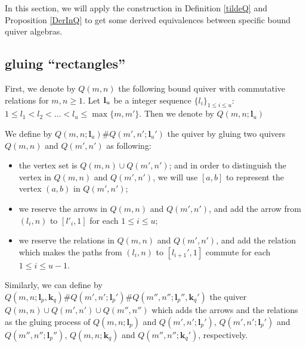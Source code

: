 \documentclass[a4paper, reqno]{amsart}
\theoremstyle{definition}
\theoremstyle{remark}
\numberwithin{equation}{section}
\begin{document}
In this section, we will apply the construction in Definition \ref{tildeQ} and Proposition \ref{DerInQ} to get some derived equivalences between specific bound quiver algebras.

\subsection{gluing ``rectangles''}
First, we denote by $Q(m,n)$ the following bound quiver with commutative relations for $m,n\geq1$. Let {\color{red}${\bf{l}}_u$ be a integer sequence} $\{l_i\}_{1\leq i \leq u}$: $ 1\leq l_1 < l_2 < \dots < l_{u} \leq \max\{m,m'\}$. Then we denote by $Q(m,n;{\mathbf{l}}_u)$
\begin{figure}[H]
    \centering
    \small{  }\label{Q(m,n)}
\end{figure}

We define by $Q(m,n;{\mathbf{l}}_u)\#Q(m',n';{\mathbf{l}}_u')$ the quiver by gluing two quivers $Q(m,n)$ and $Q(m',n')$ as following:
\begin{itemize}
\item the vertex set is $Q(m,n)\cup Q(m',n')$; and in order to distinguish the vertex in $Q(m,n)$ and $Q(m',n')$, we will use $[a,b]$ to represent the vertex $(a,b)$ in $Q(m',n')$;
\item we reserve the arrows in $Q(m,n)$ and $Q(m',n')$, and add the arrow from $(l_i,n)$ to $[l'_i,1]$ for each $1\leq i\leq u$;
\item we reserve the relations in $Q(m,n)$ and $Q(m',n')$, and add the relation which makes the paths from $(l_i,n)$ to $[l_{i+1}',1]$ commute for each $1\leq i\leq u-1$.
\end{itemize}
Similarly, we can define by $Q(m,n;{\mathbf{l}}_p,{\mathbf{k}}_q)\#Q(m',n';{\mathbf{l}}_p')\#Q(m'',n'';{\mathbf{l}}_p'',{\mathbf{k}}_q')$ the quiver $Q(m,n)\cup Q(m',n')\cup Q(m'',n'')$ which adds the arrows and the relations as the gluing process of $Q(m,n;{\mathbf{l}}_p)$ and $Q(m',n';{\mathbf{l}}_p')$, $Q(m',n';\mathbf{l}_p')$ and $Q(m'',n'';{\mathbf{l}}_p'')$, $Q(m,n;{\mathbf{k}}_q)$ and $Q(m'',n'';{\mathbf{k}}_q')$, respectively.
\end{document}
